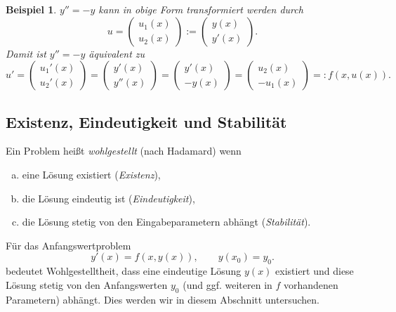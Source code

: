 \documentclass[
]{mycourse}
\theoremstyle{mythm}
\newtheorem{beispiel}[theorem]{Beispiel}
\theoremstyle{break}
\begin{document}
\begin{beispiel}
$y''=-y$ kann in obige Form transformiert werden durch
\[
u=\left( \begin{array}{c} u_1(x)\\ u_2(x) \end{array}\right) := \left( \begin{array}{c} y(x)\\ y'(x) \end{array}\right).
\]
Damit ist $y''=-y$ äquivalent zu
\[
u'=\left( \begin{array}{c} u_1'(x)\\ u_2'(x) \end{array}\right)
= \left( \begin{array}{c} y'(x)\\ y''(x) \end{array}\right)
= \left( \begin{array}{c} y'(x)\\ -y(x) \end{array}\right)
= \left( \begin{array}{c} u_2(x)\\ -u_1(x) \end{array}\right)
=:f(x,u(x)).
\]
\end{beispiel}

\subsection{Existenz, Eindeutigkeit und Stabilität}\label{subsec:wohlgestellt}

Ein Problem heißt \emph{wohlgestellt} (nach Hadamard) wenn
\begin{enumerate}[(a)]
\item eine Lösung existiert (\emph{Existenz}),
\item die Lösung eindeutig ist (\emph{Eindeutigkeit}),
\item die Lösung stetig von den Eingabeparametern abhängt (\emph{Stabilität}).
\end{enumerate}

Für das Anfangswertproblem 
\[
y'(x)=f(x,y(x)), \qquad y(x_0)=y_0.
\]
bedeutet Wohlgestelltheit, dass eine eindeutige Lösung $y(x)$ existiert und diese Lösung 
stetig von den Anfangswerten $y_0$ (und ggf. weiteren in $f$ vorhandenen Parametern) abhängt.
Dies werden wir in diesem Abschnitt untersuchen.
\end{document}
